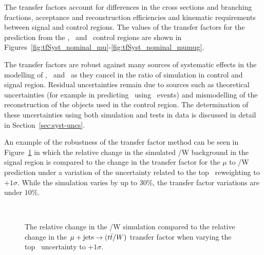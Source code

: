 The transfer factors account for differences in the cross sections and branching fractions,
acceptance and reconstruction efficiencies and kinematic requirements between signal 
and control regions. The values of the transfer factors for the prediction from the \mj,
\mmj~and \gj~control regions are shown in Figures~\ref{fig:tfSyst_nominal_mu}-\ref{fig:tfSyst_nominal_mumug}.

The transfer factors are robust against many sources of systematic effects in the modelling 
of \scalht, \nb~and \njet~as they cancel in the ratio of simulation in control and signal region. 
Residual uncertainties remain due to sources such as theoretical uncertainties (for example
in predicting \znunu~using \gj~events) and mismodelling of the reconstruction of the objects
used in the control region. The determination of these uncertainties using both simulation 
and tests in data is discussed in detail in Section~\ref{sec:syst-uncs}.

An example of the robustness of the transfer factor method can be seen 
in Figure~\ref{fig:tfSimVar} in which the relative change in the simulated \ttbar/W 
background in the signal region is compared to the change in the transfer factor for 
the $\mu$ to \ttbar/W prediction under a variation of
the uncertainty related to the top \pt~reweighting to $+1\sigma$. 
While the simulation varies 
by up to 30\%, the transfer factor variations are under $10\%$.

\begin{figure}[!ht]
  \centering
   ~~
  \\
  \caption{\label{fig:tfSimVar} The relative change in the
  \ttbar/W simulation compared to the relative change in the $\mu + \textrm{jets} \rightarrow (t\bar{t}/W)$ transfer
  factor when varying the top \pt~uncertainty to $+1\sigma$.
  }
\end{figure}

